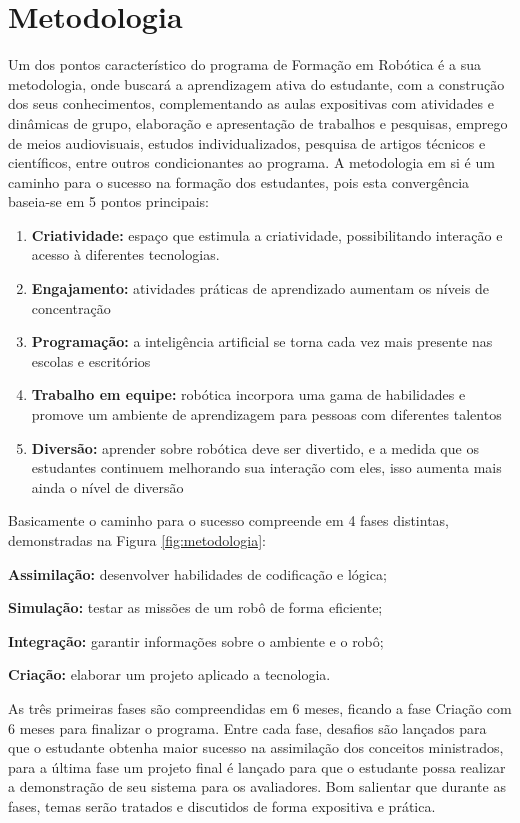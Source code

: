 \chapter{Metodologia}
\label{chap:metodologia}

Um dos pontos característico do programa de Formação em Robótica é a sua metodologia, onde buscará a aprendizagem ativa do estudante, com a construção dos seus conhecimentos, complementando as aulas expositivas com atividades e dinâmicas de grupo, elaboração e apresentação de trabalhos e pesquisas, emprego de meios audiovisuais, estudos individualizados, pesquisa de artigos técnicos e científicos, entre outros condicionantes ao programa.
A metodologia em si é um caminho para o sucesso na formação dos estudantes, pois esta convergência baseia-se em 5 pontos principais:

\begin{enumerate}
    \item \textbf{Criatividade:} espaço que estimula a criatividade, possibilitando interação e acesso à diferentes tecnologias.
    \item \textbf{Engajamento:} atividades práticas de aprendizado aumentam os níveis de concentração
    \item \textbf{Programação:} a inteligência artificial se torna cada vez mais presente nas escolas e escritórios
    \item \textbf{Trabalho em equipe:} robótica incorpora uma gama de habilidades e promove um ambiente de aprendizagem para pessoas com diferentes talentos
    \item \textbf{Diversão:} aprender sobre robótica deve ser divertido, e a medida que os estudantes continuem melhorando sua interação com eles, isso aumenta mais ainda o nível de diversão
\end{enumerate}


Basicamente o caminho para o sucesso compreende em 4 fases distintas, demonstradas na Figura \ref{fig:metodologia}:

\textbf{Assimilação:} desenvolver habilidades de codificação e lógica;

\textbf{Simulação:} testar as missões de um robô de forma eficiente;

\textbf{Integração:} garantir informações sobre o ambiente e o robô;

\textbf{Criação:} elaborar um projeto aplicado a tecnologia.

As três primeiras fases são compreendidas em 6 meses, ficando a fase Criação com 6 meses para finalizar o programa.
Entre cada fase, desafios são lançados para que o estudante obtenha maior sucesso na assimilação dos conceitos ministrados, para a última fase um projeto final é lançado para que o estudante possa realizar a demonstração de seu sistema para os avaliadores.
Bom salientar que durante as fases, temas serão tratados e discutidos de forma expositiva e prática.


